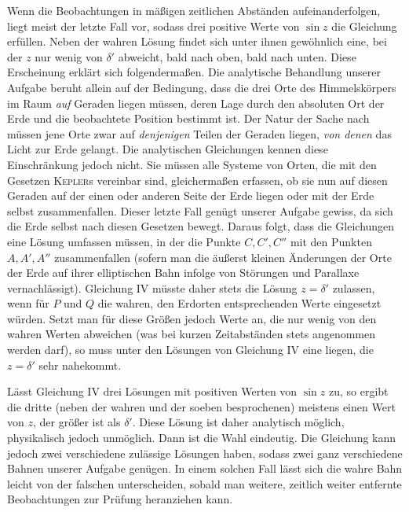 Wenn die Beobachtungen in mäßigen zeitlichen Abständen aufeinanderfolgen, liegt meist der letzte Fall vor, sodass drei positive Werte von $\sin z$ die Gleichung erfüllen. Neben der wahren Lösung findet sich unter ihnen gewöhnlich eine, bei der $z$ nur wenig von $\delta'$ abweicht, bald nach oben, bald nach unten. Diese Erscheinung erklärt sich folgendermaßen. Die analytische Behandlung unserer Aufgabe beruht allein auf der Bedingung, dass die drei Orte des Himmelskörpers im Raum \textit{auf} Geraden liegen müssen, deren Lage durch den absoluten Ort der Erde und die beobachtete Position bestimmt ist. Der Natur der Sache nach müssen jene Orte zwar auf \textit{denjenigen} Teilen der Geraden liegen, \textit{von denen} das Licht zur Erde gelangt. Die analytischen Gleichungen kennen diese Einschränkung jedoch nicht. Sie müssen alle Systeme von Orten, die mit den Gesetzen \textsc{Kepler}s vereinbar sind, gleichermaßen erfassen, ob sie nun auf diesen Geraden auf der einen oder anderen Seite der Erde liegen oder mit der Erde selbst zusammenfallen. Dieser letzte Fall genügt unserer Aufgabe gewiss, da sich die Erde selbst nach diesen Gesetzen bewegt. Daraus folgt, dass die Gleichungen eine Lösung umfassen müssen, in der die Punkte $C,C',C''$ mit den Punkten $A,A',A''$ zusammenfallen (sofern man die äußerst kleinen Änderungen der Orte der Erde auf ihrer elliptischen Bahn infolge von Störungen und Parallaxe vernachlässigt). Gleichung IV müsste daher stets die Lösung $z=\delta'$ zulassen, wenn für $P$ und $Q$ die wahren, den Erdorten entsprechenden Werte eingesetzt würden. Setzt man für diese Größen jedoch Werte an, die nur wenig von den wahren Werten abweichen (was bei kurzen Zeitabständen stets angenommen werden darf), so muss unter den Lösungen von Gleichung IV eine liegen, die $z=\delta'$ sehr nahekommt.

Lässt Gleichung IV drei Lösungen mit positiven Werten von $\sin z$ zu, so ergibt die dritte (neben der wahren und der soeben besprochenen) meistens einen Wert von $z$, der größer ist als $\delta'$. Diese Lösung ist daher analytisch möglich, physikalisch jedoch unmöglich. Dann ist die Wahl eindeutig. Die Gleichung kann jedoch zwei verschiedene zulässige Lösungen haben, sodass zwei ganz verschiedene Bahnen unserer Aufgabe genügen. In einem solchen Fall lässt sich die wahre Bahn leicht von der falschen unterscheiden, sobald man weitere, zeitlich weiter entfernte Beobachtungen zur Prüfung heranziehen kann.
